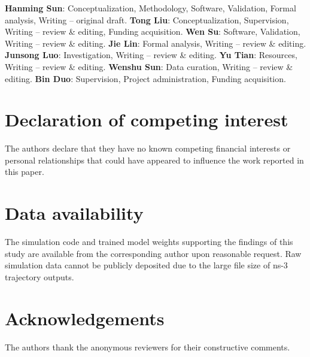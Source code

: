 \documentclass[preprint,12pt]{elsarticle}
\begin{document}
\textbf{Hanming Sun}: Conceptualization, Methodology, Software, Validation, Formal analysis, Writing -- original draft.
\textbf{Tong Liu}: Conceptualization, Supervision, Writing -- review \& editing, Funding acquisition.
\textbf{Wen Su}: Software, Validation, Writing -- review \& editing.
\textbf{Jie Lin}: Formal analysis, Writing -- review \& editing.
\textbf{Junsong Luo}: Investigation, Writing -- review \& editing.
\textbf{Yu Tian}: Resources, Writing -- review \& editing.
\textbf{Wenshu Sun}: Data curation, Writing -- review \& editing.
\textbf{Bin Duo}: Supervision, Project administration, Funding acquisition.

\section*{Declaration of competing interest}

The authors declare that they have no known competing financial interests or personal relationships that could have appeared to influence the work reported in this paper.

\section*{Data availability}

The simulation code and trained model weights supporting the findings of this study are available from the corresponding author upon reasonable request. Raw simulation data cannot be publicly deposited due to the large file size of ns-3 trajectory outputs.

\section*{Acknowledgements}

The authors thank the anonymous reviewers for their constructive comments.
\end{document}
